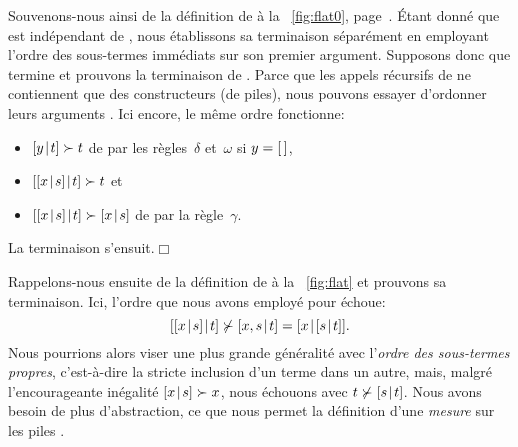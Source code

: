 Souvenons-nous ainsi de la définition de
 à la
\fig~\ref{fig:flat0}, page~\pageref{fig:flat0}. Étant donné que
 est indépendant de
, nous établissons sa terminaison séparément en
employant l'ordre des sous-termes immédiats sur son premier
argument. Supposons donc que  termine et prouvons la
terminaison de . Parce que les appels récursifs de
 ne contiennent que des constructeurs (de piles),
nous pouvons essayer d'ordonner leurs arguments
\citep{ArtsGiesl_1996}. Ici encore, le même ordre fonctionne:
\begin{itemize}

  \item \([{y}\!\mid\!{t}] \succ t\) de par les règles~\(\delta\) et~\(\omega\)
    si \(y=[\,]\),

  \item \([{[{x}\!\mid\!{s}]}\!\mid\!{t}] \succ t\) et

  \item \([{[{x}\!\mid\!{s}]}\!\mid\!{t}] \succ [{x}\!\mid\!{s}]\) de par la
    règle~\(\gamma\).

\end{itemize}
La terminaison s'ensuit.\hfill\(\Box\)

\par\vspace\baselineskip

Rappelons-nous ensuite de la définition de
 à la \fig~\vref{fig:flat} et
prouvons sa terminaison. Ici, l'ordre que nous avons employé pour
 échoue:
\begin{equation*}
  \cons{\cons{x}{s}}{t} \nsucc \cons{x,s}{t} =
  \cons{x}{\cons{s}{t}}.
\end{equation*}
Nous pourrions alors viser une plus grande généralité avec
l'\emph{ordre des sous-termes propres}, c'est-à-dire la stricte inclusion d'un terme
dans un autre, mais, malgré l'encourageante inégalité \([{x}\!\mid\!{s}]
\succ x\), nous échouons avec \(t \nsucc [{s}\!\mid\!{t}]\). Nous avons
besoin de plus d'abstraction, ce que nous permet la définition d'une
\emph{mesure} sur les piles
\citep{Giesl_1995a}.

